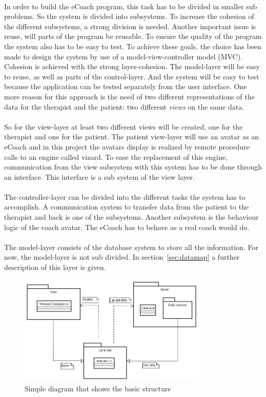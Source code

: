
\paragraph{}
In order to build the eCoach program, this task has to be divided in smaller sub problems. So the system is divided into subsystems. To increase the cohesion of the different subsystems, a strong division is needed. Another important issue is reuse, will parts of the program be reusable. To ensure the quality of the program the system also has to be easy to test. To achieve these goals, the choice has been made to design the system by use of a model-view-controller model (MVC). Cohesion is achieved  with the strong layer-cohesion. The model-layer will be easy to reuse, as well as parts of the control-layer. And the system will be easy to test because the application can be tested separately from the user interface. One more reason for this approach is the need of two different representations of the data for the therapist and the patient: two different \textit{views} on the same data.
\paragraph{}
So for the view-layer at least two different views will be created, one for the therapist and one for the patient. The patient view-layer will  use an avatar as an eCoach and in this project the avatars display is realized by remote procedure calls to an engine called vizard. To ease the replacement of this engine, communication from the view subsystem with this system has to be done through an interface. This interface is a sub system of the view layer.
\paragraph{}
The controller-layer can be divided into the different tasks the system has to accomplish. A communication system to transfer data from the patient to the therapist and back is one of the subsystems. Another subsystem is the behaviour logic of the coach avatar. The eCoach has to behave as a real coach would do. 
\paragraph{}
The model-layer consists of the database system to store all the information. For now, the model-layer is not sub divided. In section~\ref{sec:datamap} a further description of this layer is given.

\begin{figure}[H]
\centering
\includegraphics[width=0.8\textwidth]{"MVC nijncoach"}
\caption{Simple diagram that shows the basic structure}
\label{fig:mvc_diagram}
\end{figure}